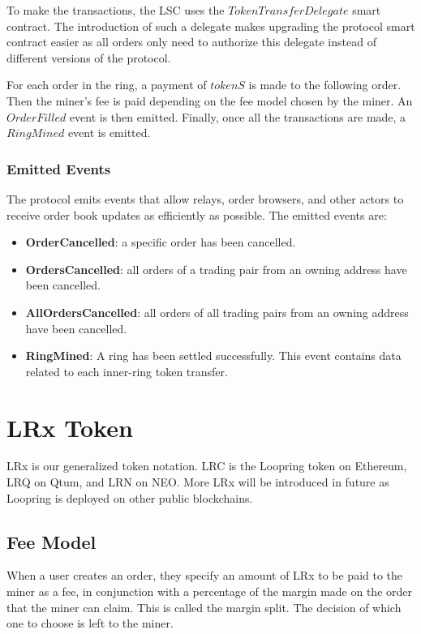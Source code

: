 \documentclass[UTF8,nofonts]{article}
\begin{document}
To make the transactions, the LSC uses the $TokenTransferDelegate$ smart contract. The introduction of such a delegate makes upgrading the protocol smart contract easier as all orders only need to authorize this delegate instead of different versions of the protocol.

For each order in the ring, a payment of $tokenS$ is made to the following order. Then the miner's fee is paid depending on the fee model chosen by the miner. An $OrderFilled$ event is then emitted. Finally, once all the transactions are made, a $RingMined$ event is emitted.

\subsubsection{Emitted Events}

The protocol emits events that allow relays, order browsers, and other actors to receive order book updates as efficiently as possible. The emitted events are:

\begin{itemize}
	\item \textbf{OrderCancelled}: a specific order has been cancelled.
	\item \textbf{OrdersCancelled}: all orders of a trading pair from an owning address have been cancelled.
	\item \textbf{AllOrdersCancelled}: all orders of all trading pairs from an owning address have been cancelled.	
	\item \textbf{RingMined}: A ring has been settled successfully. This event contains data related to each inner-ring token transfer.
\end{itemize}


\section{LRx Token}
LRx is our generalized token notation. LRC is the Loopring token on Ethereum, LRQ on Qtum, and LRN on NEO. More LRx will be introduced in future as Loopring is deployed on other public blockchains.

\subsection{Fee Model} 
When a user creates an order, they specify an amount of LRx to be paid to the miner as a fee, in conjunction with a percentage of the margin made on the order that the miner can claim. This is called the margin split. The decision of which one to choose is left to the miner.
\end{document}
